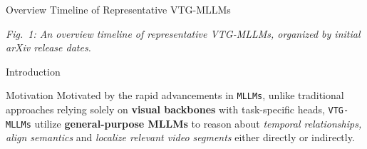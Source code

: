 \begin{frame}{Overview Timeline of Representative VTG-MLLMs}
{
    }
    \vspace{0.2em}
    {\fontsize{6}{7}\selectfont\textit{Fig.~1: An overview timeline of representative VTG-MLLMs, organized by initial arXiv release dates.}}
\end{frame}

\begin{frame}{Introduction}
    \begin{block}{Motivation}
        Motivated by the rapid advancements in \texttt{MLLMs}, unlike traditional approaches relying solely on \textbf{visual backbones} with task-specific heads, \texttt{VTG-MLLMs} utilize \textbf{general-purpose MLLMs} to reason about \textit{temporal relationships, align semantics} and \textit{localize relevant video segments} either directly or indirectly.
    \end{block}
\end{frame}

